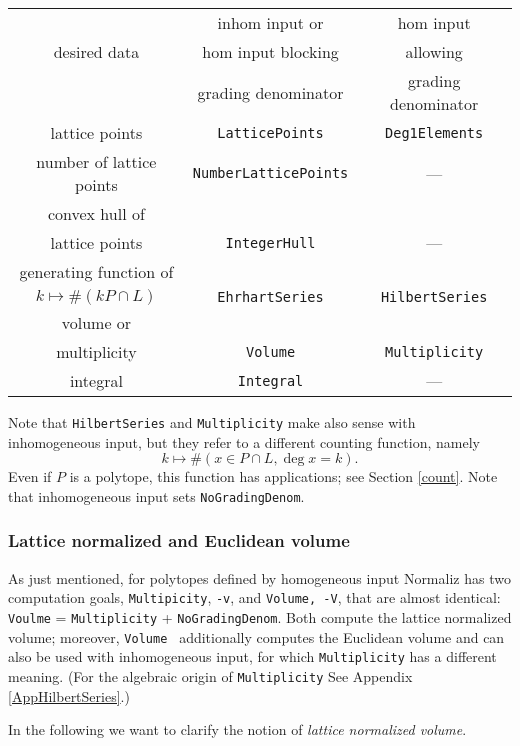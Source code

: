 \documentclass[12pt,a4paper]{scrartcl}
\theoremstyle{definition}
\begin{document}
\begin{center}
\begin{tabular}[pos]{|c|c|c|}
\hline
             & inhom input or&  hom input\\
desired data & hom input blocking & allowing\\
             &grading denominator& grading denominator\\
\hline\hline
lattice points &\verb|LatticePoints|&\verb|Deg1Elements|\\
\hline
number of lattice points& \verb|NumberLatticePoints|& ---\\ 
\hline
convex hull of&&\\
lattice points& \verb|IntegerHull|& ---\\ 
\hline
generating function of&&\\
$k\mapsto \#(kP\cap L) $&\verb|EhrhartSeries|&\verb|HilbertSeries|\\
\hline
volume or&&\\
multiplicity& \verb|Volume|&\verb|Multiplicity|\\
\hline
integral&\verb|Integral|&---\\
\hline
\end{tabular}
\end{center}

Note that \verb|HilbertSeries| and \verb|Multiplicity| make also sense with inhomogeneous input, but they refer to a different counting function, namely
$$
k\mapsto \#(x\in P\cap L, \deg x=k).
$$
Even if $P$ is a polytope, this function has applications; see Section \ref{count}. Note that inhomogeneous input sets \verb|NoGradingDenom|.

\subsubsection{Lattice normalized and Euclidean volume}\label{volume}

As just mentioned, for polytopes defined by homogeneous input Normaliz has two computation goals, \verb|Multipicity|, \verb|-v|, and \verb|Volume, -V|, that are almost identical:  \verb|Voulme| = \verb|Multiplicity| + \verb|NoGradingDenom|. Both compute the lattice normalized volume; moreover, \verb|Volume | additionally computes the Euclidean volume and can also be used with inhomogeneous input, for which \verb|Multiplicity| has a different meaning. (For the algebraic origin of \verb|Multiplicity| See Appendix \ref{AppHilbertSeries}.)

In the following we want to clarify the notion of \emph{lattice normalized volume}.
\end{document}

